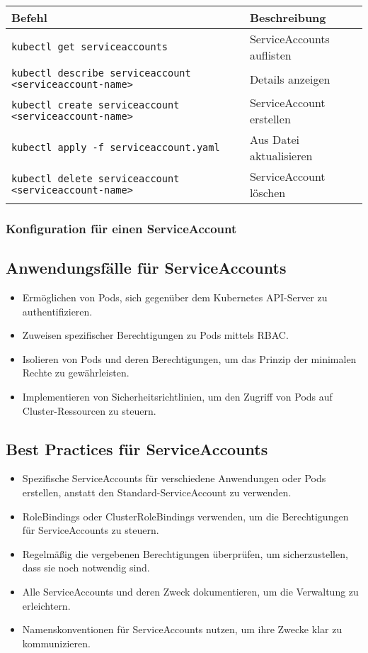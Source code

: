 \noindent
\begin{tabular}{
|p{}|p{}|}
\hline
\textbf{Befehl} & \textbf{Beschreibung} \\
\hline
\texttt{kubectl get serviceaccounts} & ServiceAccounts auflisten \\
\texttt{kubectl describe serviceaccount <serviceaccount-name>} & Details anzeigen \\
\texttt{kubectl create serviceaccount <serviceaccount-name>} & ServiceAccount erstellen \\
\texttt{kubectl apply -f serviceaccount.yaml} & Aus Datei aktualisieren\\
\texttt{kubectl delete serviceaccount <serviceaccount-name>} & ServiceAccount löschen \\
\hline
\end{tabular}

\subsubsection{Konfiguration für einen ServiceAccount}


\subsection{Anwendungsfälle für ServiceAccounts}
\begin{itemize}
    \item Ermöglichen von Pods, sich gegenüber dem Kubernetes API-Server zu authentifizieren.
    \item Zuweisen spezifischer Berechtigungen zu Pods mittels RBAC.
    \item Isolieren von Pods und deren Berechtigungen, um das Prinzip der minimalen Rechte zu gewährleisten.
    \item Implementieren von Sicherheitsrichtlinien, um den Zugriff von Pods auf Cluster-Ressourcen zu steuern.
\end{itemize}

\subsection{Best Practices für ServiceAccounts}
\begin{itemize}
    \item Spezifische ServiceAccounts für verschiedene Anwendungen oder Pods erstellen, anstatt den Standard-ServiceAccount zu verwenden.
    \item RoleBindings oder ClusterRoleBindings verwenden, um die Berechtigungen für ServiceAccounts zu steuern.
    \item Regelmäßig die vergebenen Berechtigungen überprüfen, um sicherzustellen, dass sie noch notwendig sind.
    \item Alle ServiceAccounts und deren Zweck dokumentieren, um die Verwaltung zu erleichtern.
    \item Namenskonventionen für ServiceAccounts nutzen, um ihre Zwecke klar zu kommunizieren.
\end{itemize}

